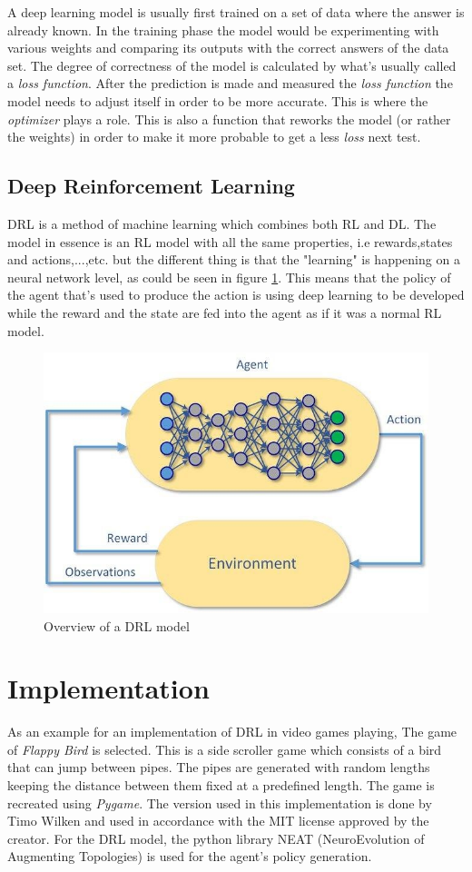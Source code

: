 \documentclass[conference]{IEEEtran}
\begin{document}
A deep learning model is usually first trained on a set of data where the answer is already known. In the training phase the model would be experimenting with various weights and comparing its outputs with the correct answers of the data set. The degree of correctness of the model is calculated by what's usually called a \textit{loss function}\cite{chollet2021deep}. After the prediction is made and measured the \textit{loss function} the model needs to adjust itself in order to be more accurate. This is where the \textit{optimizer} plays a role. This is also a function that reworks the model (or rather the weights) in order to make it more probable to get a less \textit{loss} next test.
\subsection{Deep Reinforcement Learning}

DRL is a method of machine learning which combines both RL and DL. The model in essence is an RL model with all the same properties, i.e rewards,states and actions,...,etc. but the different thing is that the "learning" is happening on a neural network level, as could be seen in figure \ref{fig:DRL}. This means that the policy of the agent that's used to produce the action is using deep learning to be developed while the reward and the state are fed into the agent as if it was a normal RL model.
\begin{figure}[h!]
	\centering
	\includegraphics[width=0.7\linewidth]{DRL.png}
	\caption{Overview of a DRL model\cite{drl}}
	\label{fig:DRL}
\end{figure}
\section{Implementation}

As an example for an implementation of DRL in video games playing, The game of \textit{Flappy Bird} is selected. This is a side scroller game which consists of a bird that can jump between pipes. The pipes are generated with random lengths keeping the distance between them fixed at a predefined length. The game is recreated using \textit{Pygame}. The version used in this implementation is done by Timo Wilken\cite{Wilken_FlappyBird} and used in accordance with the MIT license approved by the creator. For the DRL model, the python library NEAT (NeuroEvolution of Augmenting Topologies) is used for the agent's policy generation. 
\end{document}
